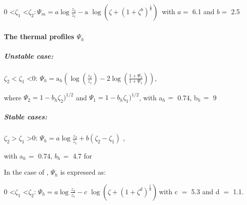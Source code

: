 0 \textless $\zeta_{1}$ \textless $\zeta_{2}$:$_{\, }\Psi_{m} =a \log\frac{z_{2} }{z_{1}
}-\mbox{a}\,\,\log\left( {\zeta+\left( {1+\zeta^{b}} \right)^{\frac{1}{b}}} \right)_{\, }$ with $a
=$ 6.1 and $b =$ 2.5

\paragraph{The thermal profiles $\Psi_{h}$}

\subparagraph{Unstable case:}

$\zeta_{2 }< \zeta_{1}$ \textless 0: $\Psi_{h}
=\mbox{a}_{h} \left( {\log \left( {\frac{z_{2}
}{z_{1} }} \right)- 2\log \left(
{\frac{1+\Psi_{2} }{1+\Psi_{1}
}} \right)} \right)$,

where $\Psi_{2} =1-b_{h} \zeta_{2} )^{1/2}$ and $\Psi_{1}
=1-b_{h} \zeta_{1}
)^{1/2}$, with a$_{h\, }=$ 0.74, b$_{h\, }=$ 9

\subparagraph{Stable cases:}

$\zeta_{2 }> \zeta_{1}$ \textgreater 0: $\Psi_{h}
=a\log\frac{z_{2} }{z_{1} }+b(\zeta_{2} -\zeta_{1} )$ ,

with a$_{h\, }=$ 0.74, $b_{h\, }= $ 4.7 for \cite{Businger:1971}

In the case of \cite{Cheng:2005}, $\Psi_{h}$ is expressed as:

0 \textless $\zeta_{1}$ \textless $\zeta_{2}$:$_{\, \, }\Psi_{h} =a \log\frac{z_{2} }{z_{1}
}-c\,\,\log\left( {\zeta+\left( {1+\zeta^{d}} \right)^{\frac{1}{d}}} \right)_{\, }$with c
$=$ 5.3 and d $=$ 1.1.

